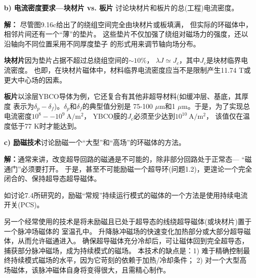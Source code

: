 \textbf{b) 电流密度要求---块材片 vs. 板片}\qquad
讨论块材片和板片的总(工程)电流密度。

\textbf{解：} 尽管图9.16c给出了的绕组空间完全由块材片或板填满，
但实际的环磁体中，相邻片间还有一个“薄”的垫片。
这些垫片不仅加强了绕组对磁场力的强度，还以沿轴向不同位置采用不同厚度垫子
的形式用来调节轴向场分布。

\textbf{块材片}\qquad 因为垫片占据不超过总绕组空间的$\sim 10\%$，
$\lambda J\simeq J_c$，其中$J_c$是块材临界电流密度。
也即，在块材片磁体中，材料临界电流密度应当不是限制产生11.74 T或更大中心场的因素。

\textbf{板片}\qquad 以涂层YBCO导体为例，它还复合有其他非超导材料(如缓冲层、基底，其厚度
表示为$\delta_p-\delta_f$)。$\delta_p$和$\delta_f$的典型值分别是
75-100 $\mu$m和1 $\mu$m。于是，为了实现总电流密度$10^8--10^9\ \mathrm{ A/m^2}$，
YBCO膜的$J_c$必须至少达到$10^{10}\ \mathrm{ A/m^2}$，
该值仅在温度低于77 K时才能达到。

\textbf{c) 励磁技术}\qquad 讨论励磁一个“大型”和“高场”的环磁体的方法。

\textbf{解：}通常来讲，改变超导回路的磁通是不可能的，除非部分回路处于正常态---
“磁通门”必须要打开。
于是，甚至不可能励磁一个超导环(问题1.2)，更遑论一个完全闭合的、保持超导态超导磁体。

如讨论7.4所研究的，励磁“常规”持续运行模式的磁体的一个方法是使用持续电流开关(PCS)。

另一个经常使用的技术是将未励磁且已处于超导态的线绕超导磁体(或块材片)置于一个脉冲场磁体的
室温孔中。
升降脉冲磁场的快速变化加热部分或大部分超导磁体，从而允许磁通进入。
确保超导磁体充分冷却后，可让磁体回到完全超导态，捕获部分脉冲磁场，成为持续模式的磁场。
本技术的缺点是：1) 难于精确控制最终持续模式磁场的水平，因为它苛刻的依赖于加热/冷却条件；
2) 对一个大型高场磁体，该脉冲磁体自身将变得很大，且需精心制作。

